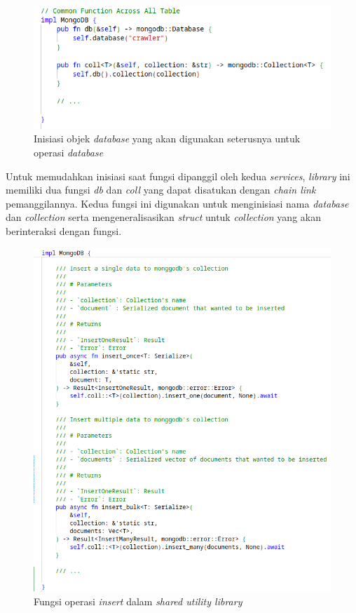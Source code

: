 \begin{figure}[H]
  \centering
  \includegraphics[keepaspectratio, width=13cm]{gambar/db-coll-func-util.png}
  \caption{Inisiasi objek \emph{database} yang akan digunakan seterusnya untuk operasi \emph{database}}
  \label{gambar:db-coll-definition}
\end{figure}

Untuk memudahkan inisiasi saat fungsi dipanggil oleh kedua \emph{services}, \emph{library} ini memiliki dua fungsi \emph{db} dan \emph{coll} yang dapat disatukan dengan \emph{chain link} pemanggilannya. Kedua fungsi ini digunakan untuk menginisiasi nama \emph{database} dan \emph{collection} serta mengeneralisasikan \emph{struct} untuk \emph{collection} yang akan berinteraksi dengan fungsi.

\begin{figure}[H]
  \centering
  \includegraphics[keepaspectratio, width=12cm]{gambar/insert-util-code.png}
  \caption{Fungsi operasi \emph{insert} dalam \emph{shared utility library}}
  \label{gambar:insert-util-code}
\end{figure}

